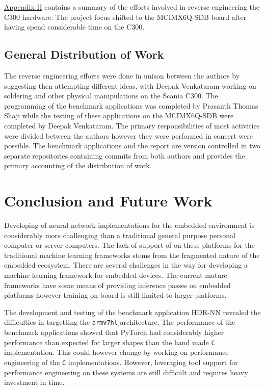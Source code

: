 \hyperref[rtc-c300]{Appendix II} contains a summary of the efforts involved in reverse engineering the C300 hardware. The project focus shifted to the MCIMX6Q-SDB board after having spend considerable time on the C300.

\section{General Distribution of Work}

The reverse engineering efforts were done in unison between the authors by suggesting then attempting different ideas, with Deepak Venkataram working on soldering and other physical manipulations on the Scania C300. The programming of the benchmark applications was completed by Prasanth Thomas Shaji while the testing of these applications on the MCIMX6Q-SDB were completed by Deepak Venkataram. The primary responsibilities of most activities were divided between the authors however they were performed in concert were possible. The benchmark applications and the report are version controlled in two separate repositories containing commits from both authors and provides the primary accounting of the distribution of work.

\chapter{Conclusion and Future Work}

Developing of neural network implementations for the embedded environment is considerably more challenging than a traditional general purpose personal computer or server computers. The lack of support of on these platforms for the traditional machine learning frameworks stems from the fragmented nature of the embedded ecosystem. There are several challenges in the way for developing a machine learning framework for embedded devices. The current mature frameworks have some means of providing inference passes on embedded platforms however training on-board is still limited to larger platforms.

The development and testing of the benchmark application HDR-NN revealed the difficulties in targetting the \texttt{armv7hl} architecture. The performance of the benchmark applications showed that PyTorch had considerably higher performance than expected for larger shapes than the hand made \texttt{C} implementation. This could however change by working on performance engineering of the \texttt{C} implementations. However, leveraging tool support for performance engineering on these systems are still difficult and requires heavy investment in time.

